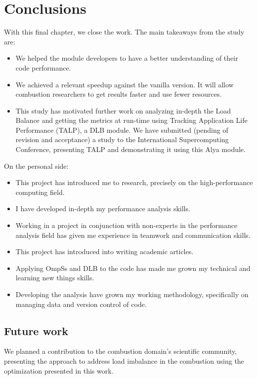 \chapter{Conclusions}

With this final chapter, we close the work. The main takeaways from the study are:
\begin{itemize}

  \item We helped the module developers to have a better understanding of their code performance.
  \item We achieved a relevant speedup against the vanilla version. It will allow combustion researchers to get results faster and use fewer resources. 
  \item This study has motivated further work on analyzing in-depth the Load Balance and getting the metrics at run-time using Tracking Application Life Performance (TALP), a DLB module. We have submitted (pending of revision and acceptance) a study to the International Supercomputing Conference, presenting TALP and demonstrating it using this Alya module.
\end{itemize}

On the personal side:
\begin{itemize}
  \item This project has introduced me to research, precisely on the high-performance computing field.
  \item I have developed in-depth my performance analysis skills.
  \item Working in a project in conjunction with non-experts in the performance analysis field has given me experience in teamwork and communication skills.
  \item This project has introduced into writing academic articles.
  \item Applying OmpSs and DLB to the code has made me grown my technical and learning new things skills.
  \item Developing the analysis have grown my working methodology, specifically on managing data and version control of code.
\end{itemize}

\section{Future work}

We planned a contribution to the combustion domain's scientific community, presenting the approach to address load imbalance in the combustion using the optimization presented in this work.  
